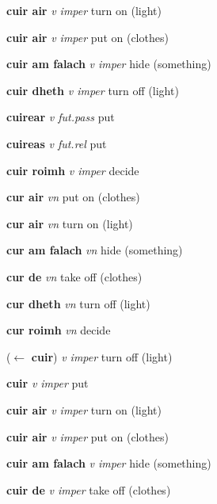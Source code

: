 \documentclass[a4paper,12pt, oneside]{article}
\newcommand \hw[1]{{\color{mygreen}{\large{\headword #1}}}}
\newcommand \lw[1]{{\textbf{\lemword #1}}}
\newcommand \sw[1]{{\textbf{{\subword #1}}}}
\begin{document}
\hspace{10mm} \sw{cuir air} \textit{v    imper} turn on (light) 

\hspace{10mm} \sw{cuir air} \textit{v    imper} put on (clothes) 

\hspace{10mm} \sw{cuir am falach} \textit{v    imper} hide (something) 

\hspace{10mm} \sw{cuir dheth} \textit{v    imper} turn off (light) 

\hspace{10mm} \sw{cuirear} \textit{v    fut.pass} put  

\hspace{10mm} \sw{cuireas} \textit{v    fut.rel} put  

\hspace{10mm} \sw{cuir roimh} \textit{v    imper} decide  

\hspace{10mm} \sw{cur air} \textit{vn    } put on (clothes) 

\hspace{10mm} \sw{cur air} \textit{vn    } turn on  (light) 

\hspace{10mm} \sw{cur am falach} \textit{vn    } hide (something) 

\hspace{10mm} \sw{cur de} \textit{vn    } take off (clothes) 

\hspace{10mm} \sw{cur dheth} \textit{vn    } turn off (light) 

\hspace{10mm} \sw{cur roimh} \textit{vn    } decide  

\hw{cuir dheth} ($\leftarrow$ \lw{cuir}) \textit{v    imper} turn off (light) 

\hspace{10mm} \sw{cuir} \textit{v    imper} put  

\hspace{10mm} \sw{cuir air} \textit{v    imper} turn on (light) 

\hspace{10mm} \sw{cuir air} \textit{v    imper} put on (clothes) 

\hspace{10mm} \sw{cuir am falach} \textit{v    imper} hide (something) 

\hspace{10mm} \sw{cuir de} \textit{v    imper} take off (clothes) 
\end{document}
